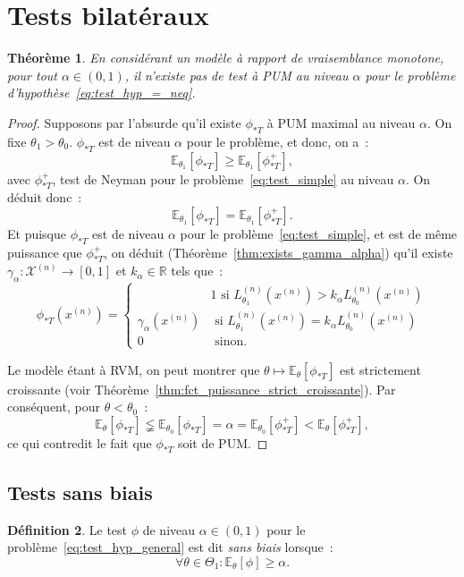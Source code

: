 \documentclass{report}
\newcommand{\E}{\mathbb E}
\newcommand{\R}{\mathbb R}
\newcommand{\n}{{(n)}}
\newtheorem{thm}{Théorème}[chapter]
\theoremstyle{definition}
\newtheorem{déf}[thm]{Définition}
\theoremstyle{remark}
\begin{document}
	\section{Tests bilatéraux}
		\begin{thm} En considérant un modèle à rapport de vraisemblance monotone, pour tout $\alpha \in (0, 1)$, il n'existe pas de test à PUM au niveau
		$\alpha$ pour le problème d'hypothèse~\eqref{eq:test_hyp_=_neq}.
		\end{thm}

		\begin{proof} Supposons par l'absurde qu'il existe $\phi_{*T}$ à PUM maximal au niveau $\alpha$. On fixe $\theta_1 > \theta_0$. $\phi_{*T}$ est de
		niveau $\alpha$ pour le problème, et donc, on a~:
		\[\E_{\theta_1}[\phi_{*T}] \geq \E_{\theta_1}[\phi_{*T}^+],\]
		avec $\phi_{*T}^+$, test de Neyman pour le problème~\eqref{eq:test_simple} au niveau $\alpha$. On déduit donc~:
		\[\E_{\theta_1}[\phi_{*T}] = \E_{\theta_1}[\phi_{*T}^+].\]
		Et puisque $\phi_{*T}$ est de niveau $\alpha$ pour le problème~\eqref{eq:test_simple}, et est de même puissance que $\phi_{*T}^+$, on déduit
		(Théorème~\ref{thm:exists_gamma_alpha}) qu'il existe $\gamma_\alpha : \mathcal X^\n \to [0, 1]$ et $k_\alpha \in \R$ tels que~:
		\[\phi_{*T}(x^\n) =
		\begin{cases}
			&1 \text{ si } L_{\theta_1}^\n(x^\n) > k_\alpha L_{\theta_0}^\n(x^\n) \\
			\gamma_\alpha(x^\n) &\text{ si } L_{\theta_1}^\n(x^\n) = k_\alpha L_{\theta_0}^\n(x^\n) \\
			0 &\text{ sinon}.
		\end{cases}\]

		Le modèle étant à RVM, on peut montrer que $\theta \mapsto \E_\theta[\phi_{*T}]$ est strictement croissante (voir
		Théorème~\ref{thm:fct_puissance_strict_croissante}). Par conséquent, pour $\theta < \theta_0$~:
		\[\E_\theta[\phi_{*T}] \lneqq \E_{\theta_0}[\phi_{*T}] = \alpha = \E_{\theta_0}[\phi_{*T}^+] < \E_\theta[\phi_{*T}^+],\]
		ce qui contredit le fait que $\phi_{*T}$ soit de PUM.
		\end{proof}

		\subsection{Tests sans biais}

			\begin{déf} Le test $\phi$ de niveau $\alpha \in (0, 1)$ pour le problème~\eqref{eq:test_hyp_general} est dit \textit{sans biais} lorsque~:
			\[\forall \theta \in \Theta_1 : \E_\theta[\phi] \geq \alpha.\]
			\end{déf}
\end{document}
